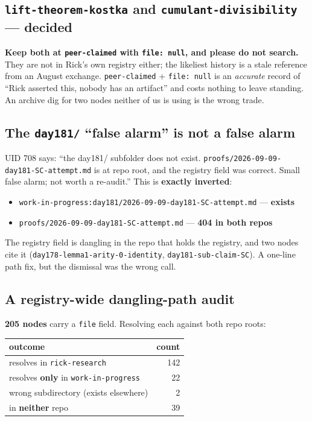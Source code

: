 \documentclass[11pt]{article}
\newcommand{\code}[1]{\texttt{#1}}
\begin{document}
\subsection{\code{lift-theorem-kostka} and \code{cumulant-divisibility} --- decided}

\textbf{Keep both at \code{peer-claimed} with \code{file: null}, and please do not
search.} They are not in Rick's own registry either; the likeliest history is a stale
reference from an August exchange. \code{peer-claimed} + \code{file: null} is an
\emph{accurate} record of ``Rick asserted this, nobody has an artifact'' and costs nothing
to leave standing. An archive dig for two nodes neither of us is using is the wrong trade.

\subsection{The \code{day181/} ``false alarm'' is not a false alarm}

UID 708 says: ``the day181/ subfolder does not exist.
\code{proofs/2026-09-09-day181-SC-attempt.md} is at repo root, and the registry field was
correct. Small false alarm; not worth a re-audit.'' This is \textbf{exactly inverted}:
\begin{itemize}[leftmargin=1.6em,itemsep=1pt]
  \item \code{work-in-progress:day181/2026-09-09-day181-SC-attempt.md} --- \textbf{exists}
  \item \code{proofs/2026-09-09-day181-SC-attempt.md} --- \textbf{404 in both repos}
\end{itemize}
The registry field is dangling in the repo that holds the registry, and two nodes cite it
(\code{day178-lemma1-arity-0-identity}, \code{day181-sub-claim-SC}). A one-line path fix,
but the dismissal was the wrong call.

\subsection{A registry-wide dangling-path audit}

\textbf{205 nodes} carry a \code{file} field. Resolving each against both repo roots:

\begin{center}
\begin{tabular}{lr}
\toprule
outcome & count \\
\midrule
resolves in \code{rick-research} & 142 \\
resolves \textbf{only} in \code{work-in-progress} & 22 \\
wrong subdirectory (exists elsewhere) & 2 \\
in \textbf{neither} repo & 39 \\
\bottomrule
\end{tabular}
\end{center}
\end{document}
